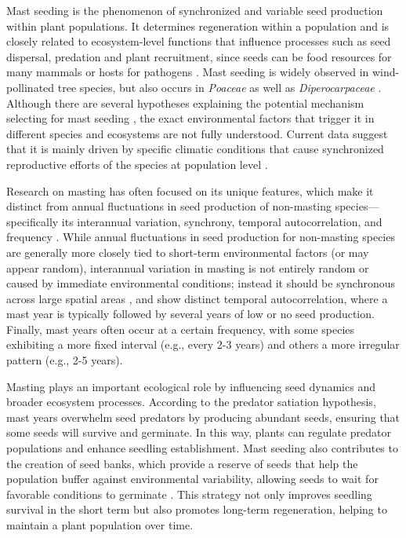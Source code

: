 \documentclass[11pt,letter]{article}
\begin{document}
Mast seeding is the phenomenon of synchronized and variable seed production within plant populations. It determines regeneration within a population and is closely related to ecosystem-level functions that influence processes such as seed dispersal, predation and plant recruitment, since seeds can be food resources for many mammals or hosts for pathogens  \citep{davies2024seed, janzen1971seed, kelly1994evolutionary}. Mast seeding is widely observed in wind-pollinated tree species, but also occurs in \textit{Poaceae} as well as \textit{Diperocarpaceae} \citep{kelly2002mast}. Although there are several hypotheses explaining the potential mechanism selecting for mast seeding  \citep[e.g., predator satiation, resource matching, etc., discussed more in Chapter 2,][]{koenig2021brief}, the exact environmental factors that trigger it in different species and ecosystems are not fully understood. Current data suggest that it is mainly driven by specific climatic conditions that cause synchronized reproductive efforts of the species at population level  \citep{pearse2016mechanisms}. \par

Research on masting has often focused on its unique features, which make it distinct from annual fluctuations in seed production of non-masting species---specifically its interannual variation, synchrony, temporal autocorrelation, and frequency \citep{hacket2021climate}. While annual fluctuations in seed production for non-masting species are generally more closely tied to short-term environmental factors (or may appear random), interannual variation in masting is not entirely random or caused by immediate environmental conditions; instead it should be synchronous across large spatial areas \citep[e.g., hundreds of kilometers,][]{kelly1994evolutionary}, and show distinct temporal autocorrelation, where a mast year is typically followed by several years of low or no seed production. Finally, mast years often occur at a certain frequency, with some species exhibiting a more fixed interval (e.g., every 2-3 years) and others a more irregular pattern (e.g., 2-5 years). \par

Masting plays an important ecological role by influencing seed dynamics and broader ecosystem processes. According to the predator satiation hypothesis, mast years overwhelm seed predators by producing abundant seeds, ensuring that some seeds will survive and germinate. In this way, plants can regulate predator populations and enhance seedling establishment. Mast seeding also contributes to the creation of seed banks, which provide a reserve of seeds that help the population buffer against environmental variability, allowing seeds to wait for favorable conditions to germinate \citep{venable1989modeling}. This strategy not only improves seedling survival in the short term but also promotes long-term regeneration, helping to maintain a plant population over time.\par
\end{document}
